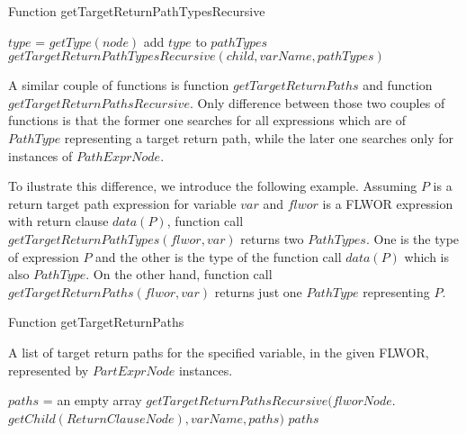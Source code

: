 \begin{algorithm}
\caption{Function getTargetReturnPathTypesRecursive}
\label{ALG_function_get_target_return_path_types_recursive}
\begin{algorithmic}[1]

	\STATE $type$ = $getType(node)$
		\STATE add $type$ to $pathTypes$
	\ENDIF
\ENDIF
{}
	\STATE $getTargetReturnPathTypesRecursive(child, varName, pathTypes)$
\ENDFOR
\end{algorithmic}
\end{algorithm}

A similar couple of functions is function $getTargetReturnPaths$ and function $getTargetReturnPathsRecursive$. Only difference between those two couples of functions is that the former one searches for all expressions which are of $PathType$ representing a target return path, while the later one searches only for instances of $PathExprNode$.

To ilustrate this difference, we introduce the following example. Assuming $P$ is a return target path expression for variable $var$ and $flwor$ is a FLWOR expression with return clause $data(P)$, function call $getTargetReturnPathTypes(flwor, var)$ returns two $PathTypes$. One is the type of expression $P$ and the other is the type of the function call $data(P)$ which is also $PathType$. On the other hand, function call $getTargetReturnPaths(flwor, var)$ returns just one $PathType$ representing $P$. 

\begin{algorithm}
\caption{Function getTargetReturnPaths}
\label{ALG_function_get_target_return_paths}
\begin{algorithmic}[1]
\ENSURE A list of target return paths for the specified variable, in the given FLWOR, represented by $PartExprNode$ instances.

\STATE $paths$ = an empty array
\STATE $getTargetReturnPathsRecursive(flworNode.$ $getChild(ReturnClauseNode), varName, paths)$
\RETURN $paths$
\end{algorithmic}
\end{algorithm}

